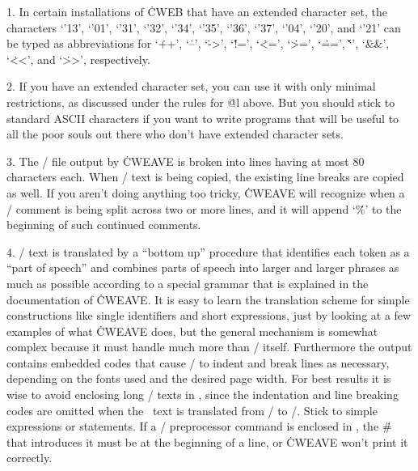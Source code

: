 1. In certain installations of \.{CWEB} that
{\def\\#1#2{`{\tentex\char'#1#2}'}%
have an extended character set, the characters
\\13, \\01, \\31, \\32, \\34, \\35,
\\36, \\37, \\04, \\20, and \\21}
can be typed as abbreviations for `\.{++}', `\.{--}', `\.{->}',
`\.{!=}', `\.{<=}', `\.{>=}', `\.{==}', `\.{\v\v}', `\.{\&\&}',
`\.{<<}', and `\.{>>}',
respectively.

2. If you have an extended character set, you can use it with only minimal
restrictions, as discussed under the rules for \.{@l} above. But you should
stick to standard ASCII characters if you want to write programs that will
be useful to all the poor souls out there who don't have extended
character sets.

3. The \TEX/ file output by \.{CWEAVE} is broken into lines having at most
80 characters each. When
\TEX/ text is being copied, the existing line breaks are copied as well.
If you aren't doing anything too tricky, \.{CWEAVE} will recognize when
a \TEX/ comment is being split across two or more lines, and it will
append `\.\%' to the beginning of such continued comments.

4. \CEE/ text is translated by a ``bottom up'' procedure that
identifies each token as a ``part of speech'' and combines parts of speech
into larger and larger phrases as much as possible according to a special
grammar that is explained in the documentation of \.{CWEAVE}. It is easy to
learn the translation scheme for simple constructions like single
identifiers and short expressions, just by looking at a few examples of
what \.{CWEAVE} does, but the general mechanism is somewhat complex because
it must handle much more than \CEE/ itself. Furthermore the output
contains embedded codes that cause \TEX/ to indent and break lines as
necessary, depending on the fonts used and the desired page width. For
best results it is wise to avoid enclosing long \CEE/ texts in \pb, since the
indentation and line breaking codes are omitted when the \pb\ text is
translated from \CEE/ to \TEX/. Stick to simple expressions or
statements.  If a \CEE/ preprocessor command is enclosed in \pb,
the \.\# that introduces it must be at the beginning of a line,
or \.{CWEAVE} won't print it correctly.

